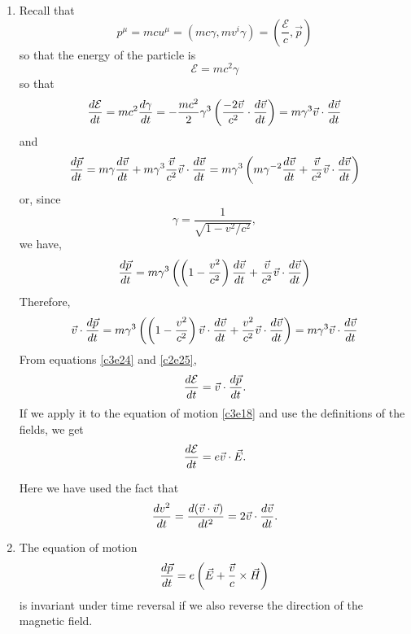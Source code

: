 \begin{enumerate}
\item Recall that 
\begin{equation}\label{c3e22}
p^\mu = mcu^\mu = (mc\gamma, mv^i\gamma) = \left(\frac{\mathcal{E}}{c}, \vec{p}\right)
\end{equation}
so that the energy of the particle is
\begin{equation}\label{c3e23}
\mathcal{E} = mc^2\gamma
\end{equation}
so that
\begin{equation}\label{c3e24}
\frac{d{\mathcal{E}}}{d{t}} = mc^2\frac{d{\gamma}}{d{t}} = 
-\frac{mc^2}{2}\gamma^3\left(\frac{-2\vec{v}}{c^2}\cdot\frac{d{\vec{v}}}{d{t}}\right)
= m\gamma^3 \vec{v}\cdot\frac{d{\vec{v}}}{d{t}}
\end{equation}
and
\[
\frac{d{\vec{p}}}{d{t}} = m\gamma\frac{d{\vec{v}}}{d{t}} + m\gamma^3\frac{\vec{v}}{c^2}\vec{v}\cdot\frac{d{\vec{v}}}{d{t}} = 
m\gamma^3\left(m\gamma^{-2}\frac{d{\vec{v}}}{d{t}} + \frac{\vec{v}}{c^2}\vec{v}\cdot\frac{d{\vec{v}}}{d{t}}\right)
\]
or, since
\[
\gamma = \frac{1}{\sqrt{1 - v^2/c^2}},
\]
we have,
\[
\frac{d{\vec{p}}}{d{t}} = m\gamma^3\left(\left(1 - \frac{v^2}{c^2}\right)\frac{d{\vec{v}}}{d{t}} + 
\frac{\vec{v}}{c^2}\vec{v}\cdot\frac{d{\vec{v}}}{d{t}}\right)
\]
Therefore,
\begin{equation}\label{c3e25}
\vec{v}\cdot\frac{d{\vec{p}}}{d{t}} = m\gamma^3\left(\left(1 - \frac{v^2}{c^2}\right)\vec{v}\cdot\frac{d{\vec{v}}}{d{t}}
+ \frac{v^2}{c^2}\vec{v}\cdot\frac{d{\vec{v}}}{d{t}}\right) = m\gamma^3\vec{v}\cdot\frac{d{\vec{v}}}{d{t}}
\end{equation}
From equations \eqref{c3e24} and \eqref{c2e25},
\begin{equation}\label{c3e26}
\frac{d{\mathcal{E}}}{d{t}} = \vec{v}\cdot\frac{d{\vec{p}}}{d{t}}.
\end{equation}
If we apply it to the equation of motion \eqref{c3e18} and use the definitions 
of the fields, we get
\begin{equation}\label{c3e27}
\frac{d{\mathcal{E}}}{d{t}} = e\vec{v}\cdot\vec{E}.
\end{equation}

Here we have used the fact that
\begin{equation}\label{c3e28}
\frac{d{v^2}}{d{t}} = \frac{d{(\vec{v}\cdot\vec{v})}}{d{t^2}} = 2\vec{v}\cdot\frac{d{\vec{v}}}{d{t}}.
\end{equation}

\item The equation of motion
\begin{equation}\label{c3e29}
\frac{d{\vec{p}}}{d{t}} = e\left(\vec{E} + \frac{\vec{v}}{c}\times\vec{H}\right)
\end{equation}
is invariant under time reversal if we also reverse the direction of the magnetic
field.


\end{enumerate}

